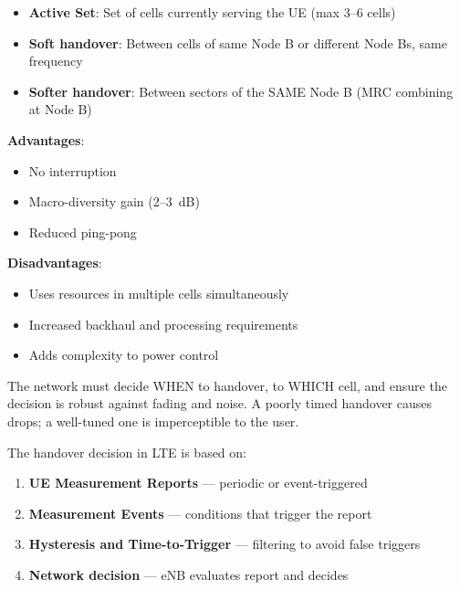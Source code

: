 
\begin{itemize}
\tightlist
\item
  \textbf{Active Set}: Set of cells currently serving the UE (max 3–6 cells)
\item
  \textbf{Soft handover}: Between cells of same Node B or different Node Bs, same frequency
\item
  \textbf{Softer handover}: Between sectors of the SAME Node B (MRC combining at Node B)
\end{itemize}

\textbf{Advantages}:

\begin{itemize}
\tightlist
\item
  No interruption
\item
  Macro-diversity gain (2–3~dB)
\item
  Reduced ping-pong
\end{itemize}

\textbf{Disadvantages}:

\begin{itemize}
\tightlist
\item
  Uses resources in multiple cells simultaneously
\item
  Increased backhaul and processing requirements
\item
  Adds complexity to power control
\end{itemize}



\CNchained{}

The network must decide WHEN to handover, to WHICH cell, and ensure the decision is robust against fading and noise. A poorly timed handover causes drops; a well-tuned one is imperceptible to the user.


The handover decision in LTE is based on:

\begin{enumerate}
\def\labelenumi{\arabic{enumi}.}
\tightlist
\item
  \textbf{UE Measurement Reports} — periodic or event-triggered
\item
  \textbf{Measurement Events} — conditions that trigger the report
\item
  \textbf{Hysteresis and Time-to-Trigger} — filtering to avoid false triggers
\item
  \textbf{Network decision} — eNB evaluates report and decides
\end{enumerate}

